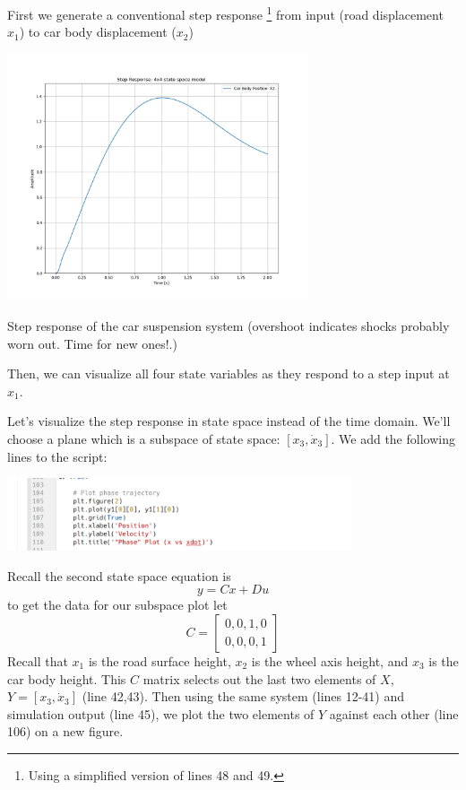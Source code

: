 \begin{ExampleCont}
First we generate a conventional step response
\footnote{Using a simplified version of lines
48 and 49.}
from input (road displacement $x_1$) to car body
displacement ($x_2$)

\begin{center}
    \includegraphics[width=3.5in]{figs08/singleCarBodyStep.png}

    {Step response of the car suspension system (overshoot indicates shocks probably
        worn out. Time for new ones!.)}\label{graphsuspensionstep}
\end{center}

Then, we can visualize all four state variables as they respond to a step input at $x_1$.

Let's visualize the step response in state space instead of the time domain.   We'll choose
a plane which is a subspace of state space: $[x_3, \dot{x}_3]$.   We add the following lines
to the script:

\begin{center}
    \includegraphics[width=4in]{figs08/ss_phase_addon.png}
\end{center}

Recall the second state space equation is
\[
y=Cx+Du
\]
to get the data for our subspace plot let
\[
C = \begin{bmatrix} 0,0,1,0 \\ 0,0,0,1 \end{bmatrix}
\]
Recall that $x_1$ is the road surface height, $x_2$ is the wheel axis height, and $x_3$ is the car body height.
This $C$ matrix selects out the last two elements of $X$, $Y=[x_3, \dot{x}_3]$ (line 42,43).  Then using
the same system (lines 12-41) and simulation output (line 45),
we plot the two elements of $Y$ against each other (line 106) on a new figure.
\end{ExampleCont}

